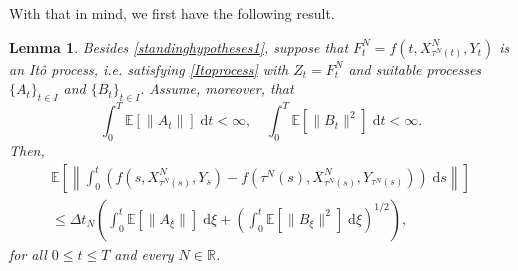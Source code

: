 \documentclass[reqno,12pt]{amsart}
\theoremstyle{plain} %
\newtheorem{lemma}{Lemma}[section]
\theoremstyle{definition} %
\begin{document}
With that in mind, we first have the following result.
\begin{lemma}
    \label{lemItostep}
    Besides \cref{standinghypotheses1}, suppose that $F_t^N = f(t, X_{\tau^N(t)}^N, Y_t)$ is an It\^o process, i.e. satisfying \eqref{Itoprocess} with $Z_t = F_t^N$ and suitable processes $\{A_t\}_{t\in I}$ and $\{B_t\}_{t\in I}.$ Assume, moreover, that
    \begin{equation}
        \label{expectItostepterms}
        \int_0^T \mathbb{E}[\|A_t\|] \;\mathrm{d}t < \infty, \quad \int_0^T \mathbb{E}[\|B_t\|^2] \;\mathrm{d}t < \infty.
    \end{equation}
    Then,
    \begin{multline}
        \label{expectintfboundbyIto}
        \mathbb{E}\left[\left\|\int_0^t \left(f(s, X_{\tau^N(s)}^N, Y_s) - f(\tau^N(s), X_{\tau^N(s)}^N, Y_{\tau^N(s)})\right)\;\mathrm{d}s\right\|\right]  \\
        \leq \Delta t_N \left(\int_0^t \mathbb{E}[\|A_\xi\|] \;\mathrm{d}\xi + \left(\int_0^t \mathbb{E}[\|B_\xi\|^2] \;\mathrm{d}\xi \right)^{1/2}\right),
    \end{multline}
    for all $0 \leq t \leq T$ and every $N\in \mathbb{R}$.
\end{lemma}
\end{document}
